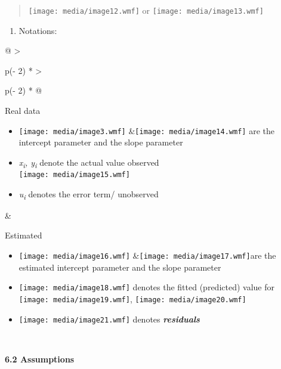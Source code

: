 \begin{quote}
\texttt{[image: media/image12.wmf]} or
\texttt{[image: media/image13.wmf]}
\end{quote}

\begin{enumerate}
\def\labelenumi{\arabic{enumi}.}
\setcounter{enumi}{3}
\item
  Notations:
\end{enumerate}

\begin{longtable}[]{@{}
  >{\raggedright\arraybackslash}p{(\columnwidth - 2\tabcolsep) * }
  >{\raggedright\arraybackslash}p{(\columnwidth - 2\tabcolsep) * }@{}}
\toprule\noalign{}
\begin{minipage}[b]{\linewidth}\raggedright
Real data

\begin{itemize}
\item
  \texttt{[image: media/image3.wmf]}
  \&\texttt{[image: media/image14.wmf]} are the intercept parameter and
  the slope parameter
\item
  \emph{x\textsubscript{i}, y\textsubscript{i}} denote the actual value
  observed\\
  \texttt{[image: media/image15.wmf]}
\item
  \emph{u\textsubscript{i}} denotes the error term/ unobserved
\end{itemize}\strut
\end{minipage} & \begin{minipage}[b]{\linewidth}\raggedright
Estimated

\begin{itemize}
\item
  \texttt{[image: media/image16.wmf]}
  \&\texttt{[image: media/image17.wmf]}are the estimated intercept
  parameter and the slope parameter
\item
  \texttt{[image: media/image18.wmf]} denotes the fitted (predicted)
  value for \texttt{[image: media/image19.wmf]},
  \texttt{[image: media/image20.wmf]}
\item
  \texttt{[image: media/image21.wmf]} denotes \emph{\textbf{residuals}}
\end{itemize}
\end{minipage} \\
\midrule\noalign{}
\endhead
\bottomrule\noalign{}
\endlastfoot
\end{longtable}

\textbf{6.2 Assumptions}

